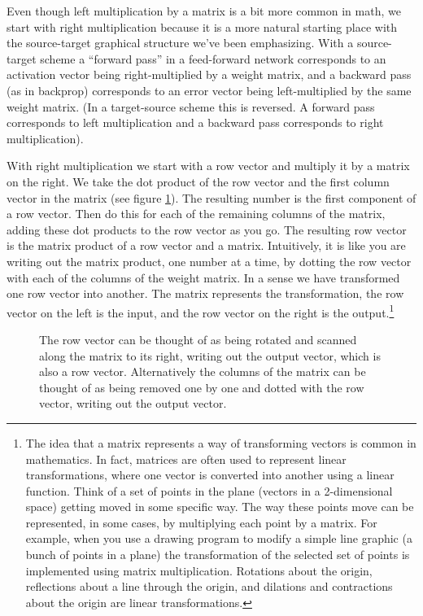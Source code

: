 Even though left multiplication by a matrix is a bit more common in math, we start with right multiplication because it is a more natural starting place with the source-target graphical structure we've been emphasizing. With a source-target scheme a  ``forward pass'' in a feed-forward network corresponds to an activation vector being right-multiplied by a weight matrix, and a backward pass (as in backprop) corresponds to an error vector being left-multiplied by the same weight matrix. (In a target-source scheme this is reversed. A forward pass corresponds to left multiplication and a backward pass corresponds to right multiplication).

With right multiplication we start with a row vector and multiply it by a matrix on the right. We take the dot product of the row vector and the first column vector in the matrix (see figure \ref{vectorMatrixProduct}). The resulting number is the first component of a row vector. Then do this for each of the remaining columns of the matrix, adding these dot products to the row vector as you go. The resulting row vector is the matrix product of a row vector and a matrix. Intuitively, it is like you are writing out the matrix product, one number at a time, by dotting the row vector with each of the columns of the weight matrix. In a sense we have transformed one row vector into another. The matrix represents the transformation, the row vector on the left is the input, and the row vector on the right is the output.\footnote{The idea that a matrix represents a way of transforming vectors is common in mathematics. In fact, matrices are often used to represent linear transformations, where one vector is converted into another using a linear function. Think of a set of points in the plane (vectors in a 2-dimensional space) getting moved in some specific way. The way these points move can be represented, in some cases, by multiplying each point by a matrix. For example, when you use a drawing program to modify a simple line graphic (a bunch of points in a plane) the transformation of the selected set of points is implemented using matrix multiplication. Rotations about the origin, reflections about a line through the origin, and dilations and contractions about the origin are linear transformations.}

\begin{figure}[h]
\centering
{}
\caption[Jeff Yoshimi.]{The row vector can be thought of as being rotated and scanned along the matrix to its right, writing out the output vector, which is also a row vector. Alternatively the columns of the matrix can be thought of as being removed one by one and dotted with the row vector, writing out the output vector.}
\label{vectorMatrixProduct}
\end{figure}

